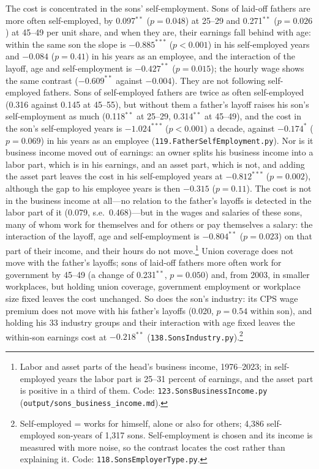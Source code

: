 The cost is concentrated in the sons' self-employment. Sons of laid-off fathers are more often self-employed, by
0.097$^{**}$ ($p = 0.048$) at 25--29 and 0.271$^{**}$ ($p = 0.026$) at 45--49 per unit share, and when they are, their
earnings fall behind with age: within the same son the slope is $-0.885^{***}$ ($p<0.001$) in his self-employed years
and $-0.084$ ($p = 0.41$) in his years as an employee, and the interaction of the layoff, age and self-employment is
$-0.427^{**}$ ($p = 0.015$); the hourly wage shows the same contrast ($-0.609^{**}$ against $-0.004$). They are not
following self-employed fathers. Sons of self-employed fathers are twice as often self-employed (0.316 against 0.145 at
45--55), but without them a father's layoff raises his son's self-employment as much (0.118$^{**}$ at 25--29,
0.314$^{**}$ at 45--49), and the cost in the son's self-employed years is $-1.024^{***}$ ($p<0.001$) a decade, against
$-0.174^{*}$ ($p = 0.069$) in his years as an employee (\texttt{119.FatherSelfEmployment.py}). Nor is it business
income moved out of earnings: an owner splits his business income into a labor part, which is in his earnings, and an
asset part, which is not, and adding the asset part leaves the cost in his self-employed years at $-0.812^{***}$
($p = 0.002$), although the gap to his employee years is then $-0.315$ ($p = 0.11$). The cost is not in the business income at all---no relation to the father's layoffs is detected in the labor part
of it (0.079, s.e.\ 0.468)---but in the wages and salaries of these sons, many of whom work for themselves and for
others or pay themselves a salary: the interaction of the layoff, age and self-employment is $-0.804^{**}$
($p = 0.023$) on that part of their income, and their hours do not move.\footnote{Labor and asset parts of the head's
business income, 1976--2023; in self-employed years the labor part is 25--31 percent of earnings, and the asset part is
positive in a third of them. Code: \texttt{123.SonsBusinessIncome.py} (\texttt{output/sons\_business\_income.md}).} Union coverage does not move with the father's
layoffs; sons of laid-off fathers more often work for government by 45--49 (a change of 0.231$^{**}$, $p = 0.050$) and,
from 2003, in smaller workplaces, but holding union coverage, government employment or workplace size fixed leaves the
cost unchanged. So does the son's industry: its CPS wage premium does not move with his father's layoffs (0.020,
$p = 0.54$ within son), and holding his 33 industry groups and their interaction with age fixed leaves the within-son
earnings cost at $-0.218^{**}$ (\texttt{138.SonsIndustry.py}).\footnote{Self-employed = works for himself, alone or also for others;
4,386 self-employed son-years of 1,317 sons. Self-employment is chosen and its income is measured with more noise, so the
contrast locates the cost rather than explaining it. Code: \texttt{118.SonsEmployerType.py}.}

